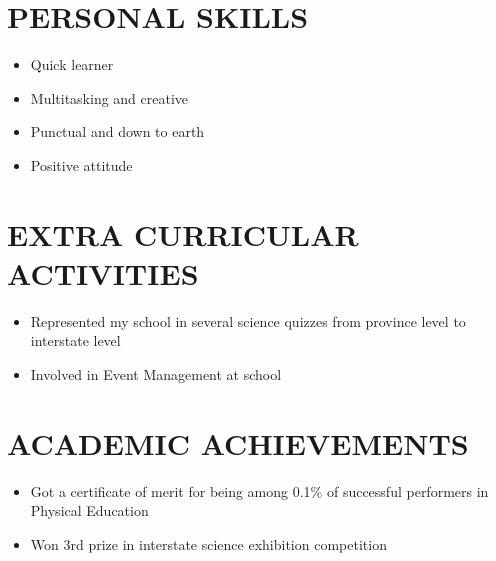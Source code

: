 \documentclass[11pt,a4paper]{article}
\begin{document}

\section*{PERSONAL SKILLS}

\begin{itemize}[leftmargin=*,noitemsep,topsep=0pt]
    \item Quick learner
    \item Multitasking and creative
    \item Punctual and down to earth
    \item Positive attitude
\end{itemize}

\vspace{4pt}


\section*{EXTRA CURRICULAR ACTIVITIES}

\begin{itemize}[leftmargin=*,noitemsep,topsep=0pt]
    \item Represented my school in several science quizzes from province level to interstate level
    \item Involved in Event Management at school
\end{itemize}

\vspace{4pt}


\section*{ACADEMIC ACHIEVEMENTS}

\begin{itemize}[leftmargin=*,noitemsep,topsep=0pt]
    \item Got a certificate of merit for being among 0.1\% of successful performers in Physical Education
    \item Won 3rd prize in interstate science exhibition competition
\end{itemize}
\end{document}
